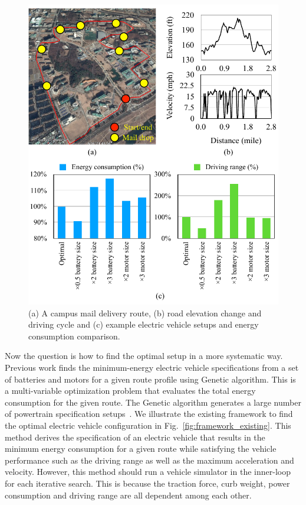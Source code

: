\documentclass[journal]{IEEEtran}
\begin{document}
\begin{figure}
\centering
\includegraphics[width=1.0\hsize]{Figures/Campus_route.pdf}
\caption{(a) A campus mail delivery route, (b) road elevation change and driving cycle and (c) example electric vehicle setups and energy consumption comparison.}
\label{fig:example_route}
\end{figure}    


Now the question is how to find the optimal setup in a more systematic way. Previous work finds the minimum-energy electric vehicle specifications from a set of batteries and motors for a given route profile using Genetic algorithm. This is a multi-variable optimization problem that evaluates the total energy consumption for the given route. The Genetic algorithm generates a large number of powertrain specification setups~\cite{Ribau:AE14}. We illustrate the existing framework to find the optimal electric vehicle configuration in Fig.~\ref{fig:framework_existing}. This method derives the specification of an electric vehicle that results in the minimum energy consumption for a given route while satisfying the vehicle performance such as the driving range as well as the maximum acceleration and velocity. However, this method should run a vehicle simulator in the inner-loop for each iterative search. This is because the traction force, curb weight, power consumption and driving range are all dependent among each other.
\end{document}
